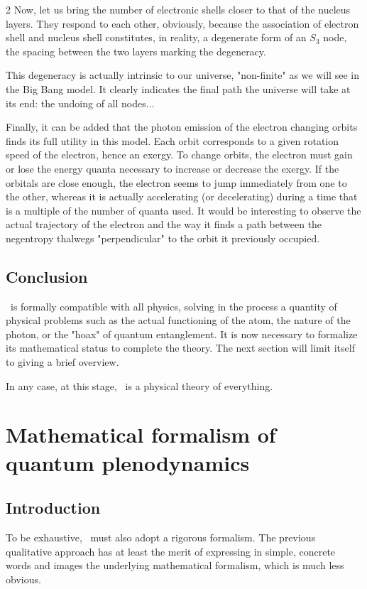 \begin{multicols}{2}
	Now, let us bring the number of electronic shells closer to that of the nucleus layers. They respond to each other, obviously, because the association of electron shell and nucleus shell constitutes, in reality, a degenerate form of an $S_3$ node, the spacing between the two layers marking the degeneracy.
	
	This degeneracy is actually intrinsic to our universe, "non-finite" as we will see in the Big Bang model. It clearly indicates the final path the universe will take at its end: the undoing of all nodes...
	
	Finally, it can be added that the photon emission of the electron changing orbits finds its full utility in this model. Each orbit corresponds to a given rotation speed of the electron, hence an exergy. To change orbits, the electron must gain or lose the energy quanta necessary to increase or decrease the exergy. If the orbitals are close enough, the electron seems to jump immediately from one to the other, whereas it is actually accelerating (or decelerating) during a time that is a multiple of the number of quanta used. It would be interesting to observe the actual trajectory of the electron and the way it finds a path between the negentropy thalwegs "perpendicular" to the orbit it previously occupied.
	
	\subsection{Conclusion}
	
	\PQ\ is formally compatible with all physics, solving in the process a quantity of physical problems such as the actual functioning of the atom, the nature of the photon, or the "hoax" of quantum entanglement. It is now necessary to formalize its mathematical status to complete the theory. The next section will limit itself to giving a brief overview.
	
	In any case, at this stage, \PQ\ is a physical theory of everything.
	
	\section{Mathematical formalism of quantum plenodynamics}
	
	\subsection{Introduction}
	
	To be exhaustive, \PQ\ must also adopt a rigorous formalism. The previous qualitative approach has at least the merit of expressing in simple, concrete words and images the underlying mathematical formalism, which is much less obvious.
	

\end{multicols}
